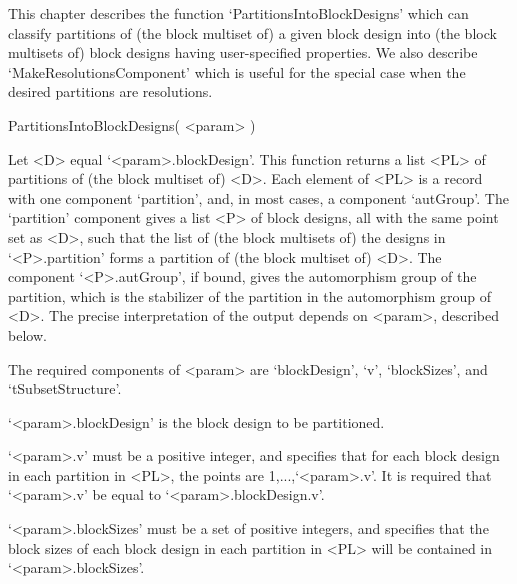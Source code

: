 %
%
%
%
\def\GRAPE{\sf GRAPE}
\def\DESIGN{\sf DESIGN}
\def\nauty{\it nauty}
\def\Aut{{\rm Aut}\,} 


This chapter describes the function `PartitionsIntoBlockDesigns' which can
classify partitions of (the block multiset of) a given block design into
(the block multisets of) block designs having user-specified properties.
We also describe `MakeResolutionsComponent' which is useful for the
special case when the desired partitions are resolutions.


\>PartitionsIntoBlockDesigns( <param> )

Let <D> equal `<param>.blockDesign'.  This function returns a list <PL>
of partitions of (the block multiset of) <D>.  Each element of <PL> is a
record with one component `partition', and, in most cases, a component
`autGroup'.  The `partition' component gives a list <P> of block designs,
all with the same point set as <D>, such that the list of (the block
multisets of) the designs in `<P>.partition' forms a partition of (the
block multiset of) <D>. The component `<P>.autGroup', if bound, gives
the automorphism group of the partition, which is the stabilizer of the
partition in the automorphism group of <D>.  The precise interpretation
of the output depends on <param>, described below.

The required components of <param> are `blockDesign', `v', `blockSizes',
and `tSubsetStructure'.

`<param>.blockDesign' is the block design to be partitioned.

`<param>.v' must be a positive integer, and specifies that for each block
design in each partition in <PL>, the points are 1,...,`<param>.v'.
It is required that `<param>.v' be equal to `<param>.blockDesign.v'.

`<param>.blockSizes' must be a set of positive integers, and specifies
that the block sizes of each block design in each partition in <PL>
will be contained in `<param>.blockSizes'.

